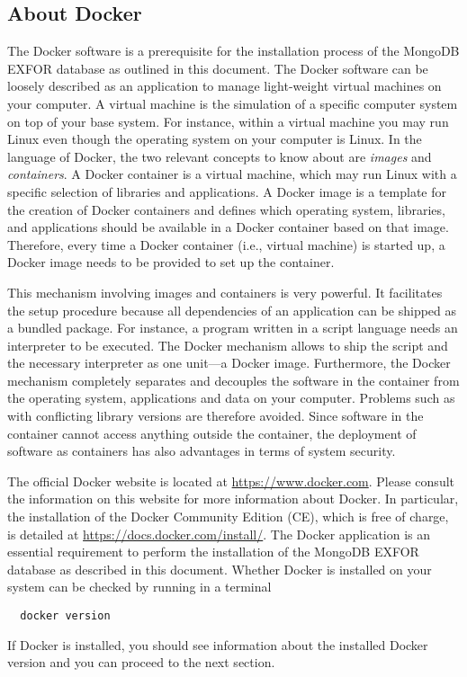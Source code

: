 \documentclass[12pt,a4paper]{scrartcl}
\begin{document}
 \subsection{About Docker}
 \label{subsec:about_docker}
 The Docker software is a prerequisite for the installation process of the MongoDB EXFOR database as outlined in this document.
 The Docker software can be loosely described as an application to manage light-weight virtual machines on your computer.
 A virtual machine is the simulation of a specific computer system on top of your base system.
 For instance, within a virtual machine you may run Linux even though the operating system on your computer is Linux.
 In the language of Docker, the two relevant concepts to know about are \textit{images} and \textit{containers}.
 A Docker container is a virtual machine, which may run Linux with a specific selection of libraries and applications.
 A Docker image is a template for the creation of Docker containers and defines which operating system, libraries, and applications should be available in a Docker container based on that image.
 Therefore, every time a Docker container (i.e., virtual machine) is started up, a Docker image needs to be provided to set up the container.

This mechanism involving images and containers is very powerful.
It facilitates the setup procedure because all dependencies of an application can be shipped as a bundled package.
For instance, a program written in a script language needs an interpreter to be executed.
The Docker mechanism allows to ship the script and the necessary interpreter as one unit---a Docker image.
Furthermore, the Docker mechanism completely separates and decouples the software in the container from the operating system, applications and data on your computer.
Problems such as with conflicting library versions are therefore avoided.
Since software in the container cannot access anything outside the container, the deployment of software as containers has also advantages in terms of system security.

The official Docker website is located at \url{https://www.docker.com}.
Please consult the information on this website for more information about Docker.
In particular, the installation of the Docker Community Edition (CE), which is free of charge, is detailed at \url{https://docs.docker.com/install/}.
The Docker application is an essential requirement to perform the installation of the MongoDB EXFOR database as described in this document.
Whether Docker is installed on your system can be checked by running in a terminal
\begin{verbatim}
  docker version
\end{verbatim}
If Docker is installed, you should see information about the installed Docker version and you can proceed to the next section.
\end{document}
